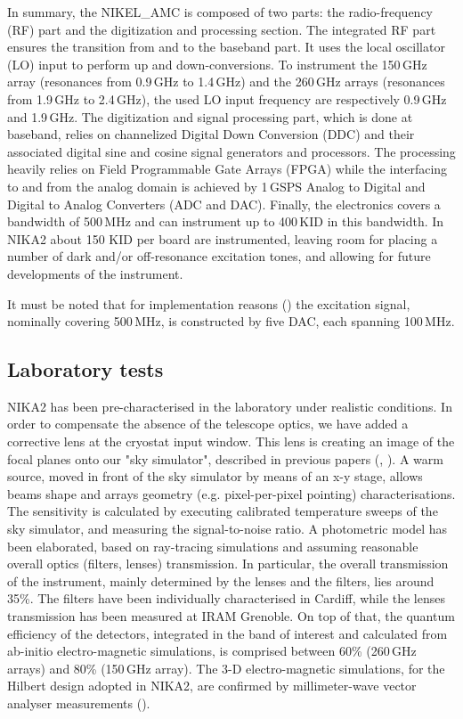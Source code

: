 \documentclass[]{aa} %
\begin{document}
In summary, the NIKEL\_AMC is composed of two parts: the radio-frequency (RF) part and the digitization and processing section.
The integrated RF part ensures the transition from and to the baseband part.
It uses the local oscillator (LO) input to perform up and down-conversions.
To instrument the 150\,GHz array (resonances from 0.9\,GHz to 1.4\,GHz) and the 260\,GHz arrays (resonances from 1.9\,GHz to 2.4\,GHz), the used LO input frequency are respectively 0.9\,GHz and 1.9\,GHz. The digitization and signal processing part, which is done at baseband, relies on channelized Digital Down Conversion (DDC) and their associated digital sine and cosine signal generators and processors.
The processing heavily relies on Field Programmable Gate Arrays (FPGA) while the interfacing to and from the analog domain is achieved by 1\,GSPS Analog to Digital and Digital to Analog Converters (ADC and DAC).
Finally, the electronics covers a bandwidth of 500\,MHz and can instrument up to 400\,KID in this bandwidth. In NIKA2 about 150 KID per board are instrumented, leaving room for placing a number of dark and/or off-resonance excitation tones, and allowing for future developments of the instrument. 

It must be noted that for implementation reasons (\cite{Bourrion2012,Bourrion2016}) the excitation signal, nominally covering 500\,MHz, is constructed by five DAC, each spanning 100\,MHz.



\subsection{Laboratory tests}
\label{Laboratory tests}

NIKA2 has been pre-characterised in the laboratory under realistic conditions. In order to compensate the absence of the telescope optics, we have added a corrective lens at the cryostat input window. This lens is creating an image of the focal planes onto our "sky simulator", described in previous papers (\cite{Catalano2014}, \cite{Monfardini2011}). A warm source, moved in front of the sky simulator by means of an x-y stage, allows beams shape and arrays geometry (e.g. pixel-per-pixel pointing) characterisations. The sensitivity is calculated by executing calibrated temperature sweeps of the sky simulator, and measuring the signal-to-noise ratio. A photometric model has been elaborated, based on ray-tracing simulations and assuming reasonable overall optics (filters, lenses) transmission. In particular, the overall transmission of the instrument, mainly determined by the lenses and the filters, lies around 35\%. The filters have been individually characterised in Cardiff, while the lenses transmission has been measured at IRAM Grenoble. On top of that, the quantum efficiency of the detectors, integrated in the band of interest and calculated from ab-initio electro-magnetic simulations, is comprised between 60\% (260\,GHz arrays) and 80\% (150\,GHz array). The 3-D electro-magnetic simulations, for the Hilbert design adopted in NIKA2, are confirmed by millimeter-wave vector analyser measurements (\cite{Roesch2012}).
\end{document}
